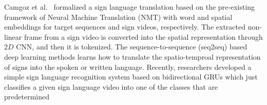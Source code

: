\documentclass[10pt,twocolumn,letterpaper]{article}
\begin{document}
Camgoz et al.~\cite{CamgozHKNB18} formalized a sign language translation based on the pre-existing framework of Neural Machine Translation (NMT) with word and spatial embeddings for target sequences and sign videos, respectively.
The extracted non-linear frame from a sign video is converted into the spatial representation through $2D$ CNN, and then it is tokenized.
The sequence-to-sequence (seq2seq) based deep learning methods learns how to translate the spatio-temproal representation of signs into the spoken or written language.
Recently, researchers developed a simple sign language recognition system based on bidirectional GRUs which just classifies a given sign language video into one of the classes that are predetermined~\cite{KoSJ18}
\end{document}
